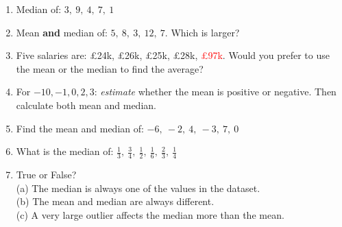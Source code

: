 \documentclass{beamer}
\newcommand{\ashow}[1]{\uncover<2->{\textcolor{red}{\small #1}}}
\newcommand{\ashowq}[1]{\alt<2->{\textcolor{red}{\small #1}}{?}}
\begin{document}
\begin{frame}
\begin{columns}[T]
\footnotesize
\vspace{0.3em}
\begin{enumerate}\itemsep1pt
  \vspace{-1em}
  \item Median of: $3,\ 9,\ 4,\ 7,\ 1$ \ashow{4}
  \item Mean \textbf{and} median of: $5,\ 8,\ 3,\ 12,\ 7$. Which is larger? \ashow{equal (both $7$)}
  \item Five salaries are: £24k, £26k, £25k, £28k, \textcolor{red}{£97k}. Would you prefer to use the mean or the median to find the average? \ashow{the median}
  \item For $-10,-1,0,2,3$: \textit{estimate} whether the mean is positive or negative. Then calculate both mean and median. \ashow{negative: mean $-1.2$; median $0$}
  \item Find the mean and median of: $-6,\ -2,\ 4,\ -3,\ 7,\ 0$ \ashow{mean $0$; median $-1$}
  \item What is the median of: $\frac{1}{3},\ \frac{3}{4},\ \frac{1}{2},\ \frac{1}{6},\ \frac{2}{3},\ \frac{1}{4}$ \ashow{$\frac{5}{12}$}
  \item True or False?\\
    (a) The median is always one of the values in the dataset. \ashow{False}\\
    (b) The mean and median are always different. \ashow{False}\\
    (c) A very large outlier affects the median more than the mean. \ashow{False}

\end{enumerate}

\end{columns}
\end{frame}
\end{document}
